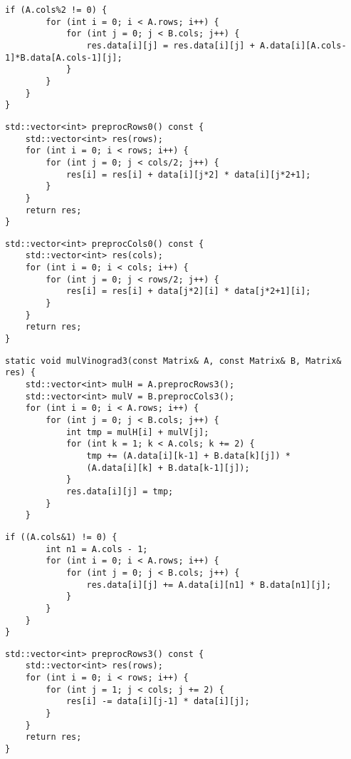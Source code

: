 \clearpage
\begin{lstlisting}[label=lst:VinSlow2,caption=Функция умножения матриц по алгоритму Винограда (окончание)]
	if (A.cols%2 != 0) {
		for (int i = 0; i < A.rows; i++) {
			for (int j = 0; j < B.cols; j++) {
				res.data[i][j] = res.data[i][j] + A.data[i][A.cols-1]*B.data[A.cols-1][j];
			}
		}
	}
}	
\end{lstlisting}

\begin{lstlisting}[label=lst:RowsSlow,caption=Функция предобработки строк]
std::vector<int> preprocRows0() const {
	std::vector<int> res(rows);
	for (int i = 0; i < rows; i++) {
		for (int j = 0; j < cols/2; j++) {
			res[i] = res[i] + data[i][j*2] * data[i][j*2+1];
		}
	}
	return res;
}	
\end{lstlisting}

\clearpage
\begin{lstlisting}[label=lst:ColsSlow,caption=Функция предобработки столбцов]
std::vector<int> preprocCols0() const {
	std::vector<int> res(cols);
	for (int i = 0; i < cols; i++) {
		for (int j = 0; j < rows/2; j++) {
			res[i] = res[i] + data[j*2][i] * data[j*2+1][i];
		}
	}
	return res;
}
\end{lstlisting}

\begin{lstlisting}[label=lst:Vin,caption=Функция умножения матриц по алгоритму Винограда с оптимизациями (начало)]
static void mulVinograd3(const Matrix& A, const Matrix& B, Matrix& res) {
	std::vector<int> mulH = A.preprocRows3();
	std::vector<int> mulV = B.preprocCols3();
	for (int i = 0; i < A.rows; i++) {
		for (int j = 0; j < B.cols; j++) {
			int tmp = mulH[i] + mulV[j];
			for (int k = 1; k < A.cols; k += 2) {
				tmp += (A.data[i][k-1] + B.data[k][j]) *
				(A.data[i][k] + B.data[k-1][j]);
			}
			res.data[i][j] = tmp;
		}
	}
\end{lstlisting}
\clearpage
\begin{lstlisting}[label=lst:Vin,caption=Функция умножения матриц по алгоритму Винограда с оптимизациями (окончание)]
	if ((A.cols&1) != 0) {
		int n1 = A.cols - 1;
		for (int i = 0; i < A.rows; i++) {
			for (int j = 0; j < B.cols; j++) {
				res.data[i][j] += A.data[i][n1] * B.data[n1][j];
			}
		}
	}
}
\end{lstlisting}

\begin{lstlisting}[label=lst:Rows,caption=Функция предобработки строк с оптимизациями]
std::vector<int> preprocRows3() const {
	std::vector<int> res(rows);
	for (int i = 0; i < rows; i++) {
		for (int j = 1; j < cols; j += 2) {
			res[i] -= data[i][j-1] * data[i][j];
		}
	}
	return res;
}
\end{lstlisting}

